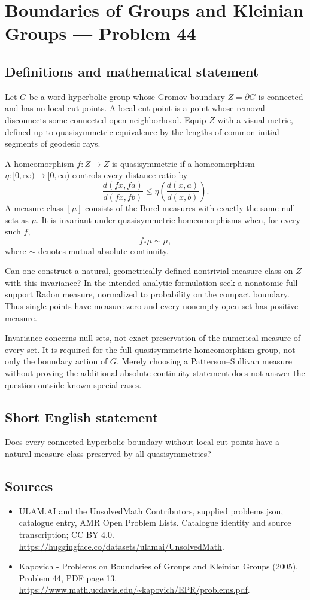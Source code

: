 \documentclass[11pt,a4paper]{article}
\begin{document}
\section*{Boundaries of Groups and Kleinian Groups — Problem 44}\label{statement}

\subsection{Definitions and mathematical statement}
Let $G$ be a word-hyperbolic group whose Gromov boundary $Z=\partial G$ is connected and has no local cut points. A local cut point is a point whose removal disconnects some connected open neighborhood. Equip $Z$ with a visual metric, defined up to quasisymmetric equivalence by the lengths of common initial segments of geodesic rays.

A homeomorphism $f:Z\to Z$ is quasisymmetric if a homeomorphism $\eta:[0,\infty)\to[0,\infty)$ controls every distance ratio by
\[
 \frac{d(fx,fa)}{d(fx,fb)}\leq
                 \eta\!\left(\frac{d(x,a)}{d(x,b)}\right).
\]
A measure class $[\mu]$ consists of the Borel measures with exactly the same null sets as $\mu$. It is invariant under quasisymmetric homeomorphisms when, for every such $f$,
\[
 f_*\mu\sim\mu,
\]
where $\sim$ denotes mutual absolute continuity.

Can one construct a natural, geometrically defined nontrivial measure class on $Z$ with this invariance? In the intended analytic formulation seek a nonatomic full-support Radon measure, normalized to probability on the compact boundary. Thus single points have measure zero and every nonempty open set has positive measure.

Invariance concerns null sets, not exact preservation of the numerical measure of every set. It is required for the full quasisymmetric homeomorphism group, not only the boundary action of $G$. Merely choosing a Patterson--Sullivan measure without proving the additional absolute-continuity statement does not answer the question outside known special cases.
\subsection{Short English statement}
Does every connected hyperbolic boundary without local cut points have a natural measure class preserved by all quasisymmetries?
\subsection{Sources}
\begin{itemize}
\item[S1] ULAM.AI and the UnsolvedMath Contributors, supplied problems.json, catalogue entry, AMR Open Problem Lists. Catalogue identity and source transcription; CC BY 4.0.
\url{https://huggingface.co/datasets/ulamai/UnsolvedMath}.
\item[S2] Kapovich - Problems on Boundaries of Groups and Kleinian Groups (2005), Problem 44, PDF page 13. 
\url{https://www.math.ucdavis.edu/~kapovich/EPR/problems.pdf}.
\end{itemize}
\end{document}
